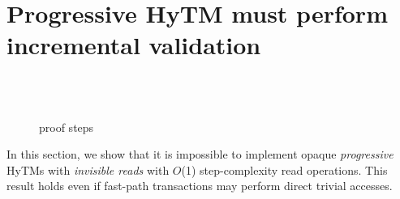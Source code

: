 \section{Progressive HyTM must perform incremental validation}
\label{sec:lb}
%
%
\begin{figure*}[!ht]
\begin{center}
        \\
        \vspace{2mm}
	\\
	\vspace{2mm}
	\caption{proof steps
        \label{fig:indis}} 
\end{center}
\end{figure*}
%
In this section, we show that it is impossible to implement opaque \emph{progressive} HyTMs with \emph{invisible reads}
with $O$(1) step-complexity read operations. This result holds even if fast-path transactions may perform
direct trivial accesses.

